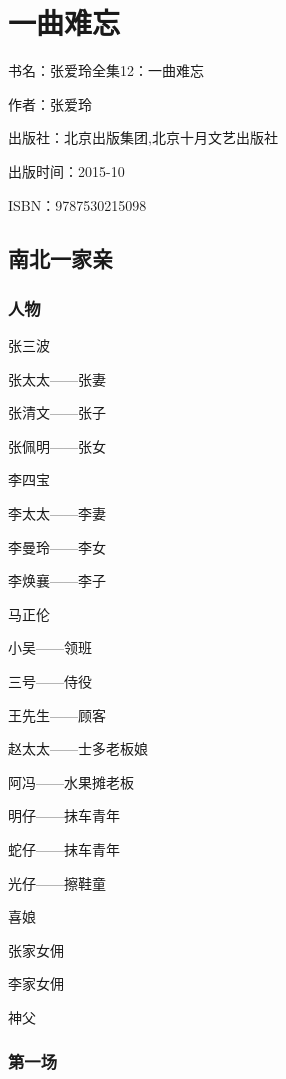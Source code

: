 
\section{一曲难忘}

\par 书名：张爱玲全集12：一曲难忘
\par 作者：张爱玲
\par 出版社：北京出版集团,北京十月文艺出版社
\par 出版时间：2015-10
\par ISBN：9787530215098


\subsection{南北一家亲}

\subsubsection*{人物}


\par 张三波
\par 张太太——张妻
\par 张清文——张子
\par 张佩明——张女
\par 李四宝
\par 李太太——李妻
\par 李曼玲——李女
\par 李焕襄——李子
\par 马正伦
\par 小吴——领班
\par 三号——侍役
\par 王先生——顾客
\par 赵太太——士多老板娘
\par 阿冯——水果摊老板
\par 明仔——抹车青年
\par 蛇仔——抹车青年
\par 光仔——擦鞋童
\par 喜娘
\par 张家女佣
\par 李家女佣
\par 神父














\subsubsection*{第一场}



